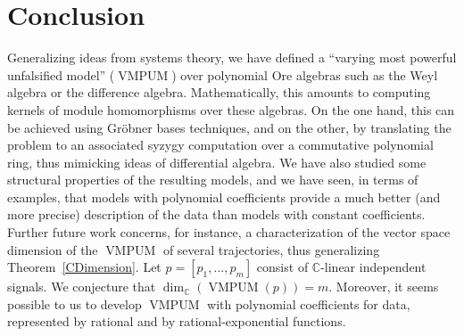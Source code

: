 \documentclass[a4paper,10pt]{article}
\theoremstyle{nonumberplain}
\newcommand{\C}{\mathbb{C}}
\DeclareMathOperator{\VMPUM}{VMPUM}
\begin{document}
\section*{Conclusion} 
Generalizing ideas from systems theory,
we have defined a ``varying most powerful unfalsified model'' ($\VMPUM$)
over polynomial Ore algebras such as the Weyl algebra or the
difference algebra. Mathematically, this amounts to computing
kernels of module homomorphisms over these algebras. On the
one hand, this can be achieved using Gr\"obner bases techniques, 
and on the other,
by translating the problem to an associated syzygy computation 
over a commutative polynomial ring, thus mimicking ideas of differential
algebra.
We have also studied some structural properties of the resulting models,
and we have seen, in terms of examples, 
that models with polynomial coefficients provide
a much better (and more precise) description of the data than models with constant
coefficients. 
Further future work concerns, for instance, a characterization of the
vector space dimension of the $\VMPUM$ of several trajectories,
thus generalizing Theorem~\ref{CDimension}. 
Let $p=[p_1, \dots, p_m]$ consist of $\C$-linear independent signals.
We conjecture that $\dim_\C(\VMPUM(p))=m$. Moreover, it seems possible to us to develop $\VMPUM$ with polynomial coefficients for data, represented by rational and by rational-exponential functions.
\end{document}
